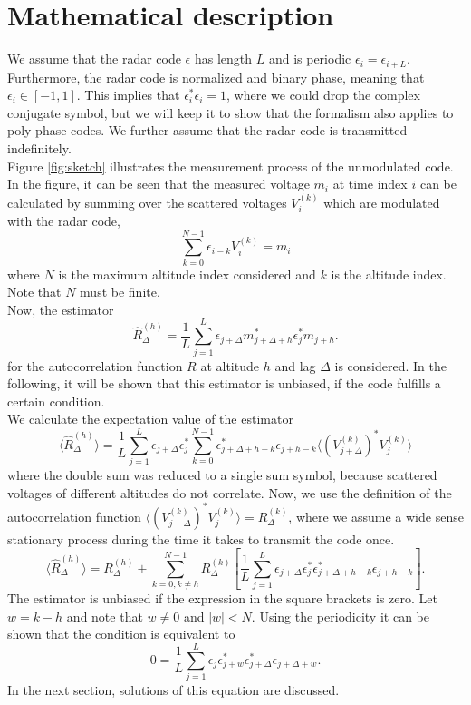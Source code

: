 \documentclass[18pt,a4paper]{extarticle}
\begin{document}
\section{Mathematical description}
We assume that the radar code $\epsilon$ has length $L$ and is periodic $\epsilon_i = \epsilon_{i + L}$.
Furthermore, the radar code is normalized and binary phase, meaning that $\epsilon_i \in [-1, 1]$.
This implies that $\epsilon_i^*\epsilon_i = 1$, where we could drop the complex conjugate symbol, but we will keep it to show that the formalism also applies to poly-phase codes.
We further assume that the radar code is transmitted indefinitely.\\
Figure \ref{fig:sketch} illustrates the measurement process of the unmodulated code.
In the figure, it can be seen that the measured voltage $m_i$ at time index $i$ can be calculated by summing over the scattered voltages $V^{(k)}_i$ which are modulated with the radar code,
\begin{equation}
\sum_{k=0}^{N-1} \epsilon_{i-k} V^{(k)}_i = m_i
\end{equation}
where $N$ is the maximum altitude index considered and $k$ is the altitude index.
Note that $N$ must be finite.\\
Now, the estimator
\begin{equation}
\hat{R}^{(h)}_\Delta = \frac{1}{L}\sum^L_{j=1}\epsilon_{j + \Delta}m_{j + \Delta + h}^* \epsilon_j^*m_{j + h}.
\end{equation}
for the autocorrelation function $R$ at altitude $h$ and lag $\Delta$ is considered.
In the following, it will be shown that this estimator is unbiased, if the code fulfills a certain condition.\\
We calculate the expectation value of the estimator
\begin{equation}
\langle \hat{R}^{(h)}_\Delta \rangle
=\frac{1}{L}\sum^L_{j=1} \epsilon_{j + \Delta}\epsilon_j^* \sum_{k=0}^{N-1} \epsilon_{j+\Delta+h-k}^*\epsilon_{j+h-k} \langle (V^{(k)}_{j + \Delta})^*V^{(k)}_j \rangle
\end{equation}
where the double sum was reduced to a single sum symbol, because scattered voltages of different altitudes do not correlate.
Now, we use the definition of the autocorrelation function $\langle (V_{j+\Delta}^{(k)})^* V_j^{(k)} \rangle = R^{(k)}_\Delta$, where we assume a wide sense stationary process during the time it takes to transmit the code once.
\begin{equation}
\langle \hat{R}^{(h)}_\Delta \rangle
= R^{(h)}_\Delta + \sum_{k=0,k\neq h}^{N-1}R^{(k)}_\Delta
\left[ \frac{1}{L}\sum^L_{j=1}\epsilon_{j + \Delta}\epsilon_j^* \epsilon_{j+\Delta+h-k}^*\epsilon_{j+h-k}\right].
\end{equation}
The estimator is unbiased if the expression in the square brackets is zero.
Let $w = k - h$ and note that $w \neq 0$ and $|w| < N$.
Using the periodicity it can be shown that the condition is equivalent to
\begin{equation}
0 = \frac{1}{L}\sum^L_{j=1}\epsilon_{j}\epsilon_{j+w}^* \epsilon_{j+\Delta}^*\epsilon_{j + \Delta + w}.
\label{eq:cond}
\end{equation}
In the next section, solutions of this equation are discussed.
\end{document}
